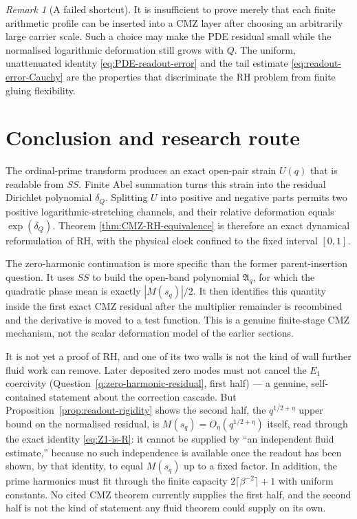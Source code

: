 \documentclass[11pt]{amsart}
\numberwithin{equation}{section}
\theoremstyle{plain}
\theoremstyle{definition}
\theoremstyle{remark}
\newtheorem{remark}[theorem]{Remark}
\begin{document}
\begin{remark}[A failed shortcut]
\label{rem:failed-shortcut}
It is insufficient to prove merely that each finite arithmetic profile can be
inserted into a CMZ layer after choosing an arbitrarily large carrier scale.
Such a choice may make the PDE residual small while the normalised logarithmic
deformation still grows with $Q$.  The uniform, unattenuated identity
\eqref{eq:PDE-readout-error} and the tail estimate
\eqref{eq:readout-error-Cauchy} are the properties that discriminate the RH
problem from finite gluing flexibility.
\end{remark}

\section{Conclusion and research route}
\label{sec:conclusion}

The ordinal-prime transform produces an exact open-pair strain $U(q)$ that is
readable from $SS$.  Finite Abel summation turns this strain into the residual
Dirichlet polynomial $\delta_Q$.  Splitting $U$ into positive and negative
parts permits two positive logarithmic-stretching channels, and their relative
deformation equals $\exp(\delta_Q)$.  Theorem
\ref{thm:CMZ-RH-equivalence} is therefore an exact dynamical reformulation of
RH, with the physical clock confined to the fixed interval $[0,1]$.

The zero-harmonic continuation is more specific than the former
parent-insertion question.  It uses $SS$ to build the open-band polynomial
$\mathfrak A_q$, for which the quadratic phase mean is exactly
$|M(s_q)|/2$.  It then identifies this quantity inside the first exact CMZ
residual after the multiplier remainder is recombined and the derivative is
moved to a test function.  This is a genuine finite-stage CMZ mechanism, not
the scalar deformation model of the earlier sections.

It is not yet a proof of RH, and one of its two walls is not the kind of
wall further fluid work can remove.  Later deposited zero modes must not
cancel the $E_1$ coercivity (Question~\ref{q:zero-harmonic-residual}, first
half) --- a genuine, self-contained statement about the correction cascade.
But Proposition~\ref{prop:readout-rigidity} shows the second half, the
$q^{1/2+\eta}$ upper bound on the normalised residual, is
$M(s_q)=O_\eta(q^{1/2+\eta})$ itself, read through the exact identity
\eqref{eq:Z1-is-R}: it cannot be supplied by ``an independent fluid
estimate,'' because no such independence is available once the readout has
been shown, by that identity, to equal $M(s_q)$ up to a fixed factor.  In
addition, the prime harmonics must fit through the finite capacity
$2\lceil\beta^{-2}\rceil+1$ with uniform constants.  No cited CMZ theorem
currently supplies the first half, and the second half is not the kind of
statement any fluid theorem could supply on its own.
\end{document}
